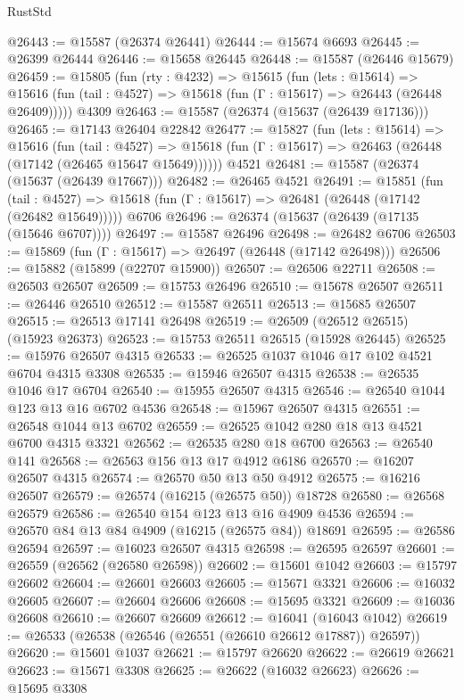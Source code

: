 \begin{lexlean}{RustStd}
\begin{coremodule}
@26443 := @15587 (@26374 @26441)
@26444 := @15674 @6693
@26445 := @26399 @26444
@26446 := @15658 @26445
@26448 := @15587 (@26446 @15679)
@26459 := @15805
    (fun (rty : @4232) =>
    @15615
      (fun (lets : @15614) =>
      @15616 (fun (tail : @4527) => @15618 (fun (Γ : @15617) => @26443 (@26448 @26409)))))
    @4309
@26463 := @15587 (@26374 (@15637 (@26439 @17136)))
@26465 := @17143 @26404 @22842
@26477 := @15827
    (fun (lets : @15614) =>
    @15616
      (fun (tail : @4527) =>
      @15618 (fun (Γ : @15617) => @26463 (@26448 (@17142 (@26465 @15647 @15649))))))
    @4521
@26481 := @15587 (@26374 (@15637 (@26439 @17667)))
@26482 := @26465 @4521
@26491 := @15851
    (fun (tail : @4527) => @15618 (fun (Γ : @15617) => @26481 (@26448 (@17142 (@26482 @15649)))))
    @6706
@26496 := @26374 (@15637 (@26439 (@17135 (@15646 @6707))))
@26497 := @15587 @26496
@26498 := @26482 @6706
@26503 := @15869 (fun (Γ : @15617) => @26497 (@26448 (@17142 @26498)))
@26506 := @15882 (@15899 (@22707 @15900))
@26507 := @26506 @22711
@26508 := @26503 @26507
@26509 := @15753 @26496
@26510 := @15678 @26507
@26511 := @26446 @26510
@26512 := @15587 @26511
@26513 := @15685 @26507
@26515 := @26513 @17141 @26498
@26519 := @26509 (@26512 @26515) (@15923 @26373)
@26523 := @15753 @26511 @26515 (@15928 @26445)
@26525 := @15976 @26507 @4315
@26533 := @26525 @1037 @1046 @17 @102 @4521 @6704 @4315 @3308
@26535 := @15946 @26507 @4315
@26538 := @26535 @1046 @17 @6704
@26540 := @15955 @26507 @4315
@26546 := @26540 @1044 @123 @13 @16 @6702 @4536
@26548 := @15967 @26507 @4315
@26551 := @26548 @1044 @13 @6702
@26559 := @26525 @1042 @280 @18 @13 @4521 @6700 @4315 @3321
@26562 := @26535 @280 @18 @6700
@26563 := @26540 @141
@26568 := @26563 @156 @13 @17 @4912 @6186
@26570 := @16207 @26507 @4315
@26574 := @26570 @50 @13 @50 @4912
@26575 := @16216 @26507
@26579 := @26574 (@16215 (@26575 @50)) @18728
@26580 := @26568 @26579
@26586 := @26540 @154 @123 @13 @16 @4909 @4536
@26594 := @26570 @84 @13 @84 @4909 (@16215 (@26575 @84)) @18691
@26595 := @26586 @26594
@26597 := @16023 @26507 @4315
@26598 := @26595 @26597
@26601 := @26559 (@26562 (@26580 @26598))
@26602 := @15601 @1042
@26603 := @15797 @26602
@26604 := @26601 @26603
@26605 := @15671 @3321
@26606 := @16032 @26605
@26607 := @26604 @26606
@26608 := @15695 @3321
@26609 := @16036 @26608
@26610 := @26607 @26609
@26612 := @16041 (@16043 @1042)
@26619 := @26533 (@26538 (@26546 (@26551 (@26610 @26612 @17887)) @26597))
@26620 := @15601 @1037
@26621 := @15797 @26620
@26622 := @26619 @26621
@26623 := @15671 @3308
@26625 := @26622 (@16032 @26623)
@26626 := @15695 @3308

\end{coremodule}
\end{lexlean}
